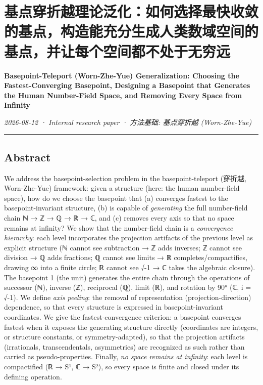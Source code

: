 \documentclass[
]{article}
\author{}
\date{}
\begin{document}
\section{基点穿折越理论泛化：如何选择最快收敛的基点，构造能充分生成人类数域空间的基点，并让每个空间都不处于无穷远}\label{ux57faux70b9ux7a7fux6298ux8d8aux7406ux8bbaux6cdbux5316ux5982ux4f55ux9009ux62e9ux6700ux5febux6536ux655bux7684ux57faux70b9ux6784ux9020ux80fdux5145ux5206ux751fux6210ux4ebaux7c7bux6570ux57dfux7a7aux95f4ux7684ux57faux70b9ux5e76ux8ba9ux6bcfux4e2aux7a7aux95f4ux90fdux4e0dux5904ux4e8eux65e0ux7a77ux8fdc}

\textbf{Basepoint-Teleport (Worn-Zhe-Yue) Generalization: Choosing the
Fastest-Converging Basepoint, Designing a Basepoint that Generates the
Human Number-Field Space, and Removing Every Space from Infinity}

\emph{2026-08-12 · Internal research paper · 方法基础: 基点穿折越
(Worn-Zhe-Yue)}

\begin{center}\rule{0.5\linewidth}{0.5pt}\end{center}

\subsection{Abstract}\label{abstract}

We address the basepoint-selection problem in the basepoint-teleport
(穿折越, Worn-Zhe-Yue) framework: given a structure (here: the human
number-field space), how do we choose the basepoint that (a) converges
fastest to the basepoint-invariant structure, (b) is capable of
\emph{generating} the full number-field chain ℕ → ℤ → ℚ → ℝ → ℂ, and (c)
removes every axis so that no space remains at infinity? We show that
the number-field chain is a \emph{convergence hierarchy}: each level
incorporates the projection artifacts of the previous level as explicit
structure (ℕ cannot see subtraction → ℤ adds inverses; ℤ cannot see
division → ℚ adds fractions; ℚ cannot see limits → ℝ
completes/compactifies, drawing ∞ into a finite circle; ℝ cannot see √-1
→ ℂ takes the algebraic closure). The basepoint 1 (the unit) generates
the entire chain through the operations of successor (ℕ), inverse (ℤ),
reciprocal (ℚ), limit (ℝ), and rotation by 90° (ℂ, i = √-1). We define
\emph{axis peeling}: the removal of representation
(projection-direction) dependence, so that every structure is expressed
in basepoint-invariant coordinates. We give the fastest-convergence
criterion: a basepoint converges fastest when it exposes the generating
structure directly (coordinates are integers, or structure constants, or
symmetry-adapted), so that the projection artifacts (irrationals,
transcendentals, asymmetries) are recognized as such rather than carried
as pseudo-properties. Finally, \emph{no space remains at infinity}: each
level is compactified (ℝ → S¹, ℂ → S²), so every space is finite and
closed under its defining operation.
\end{document}
